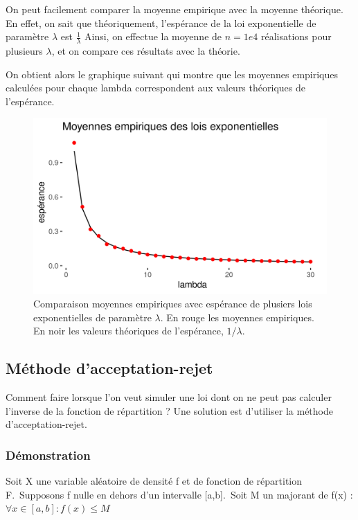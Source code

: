 \documentclass[10pt]{article} %
\begin{document}
On peut facilement comparer la moyenne empirique avec la moyenne théorique. En effet, on sait que théoriquement, l'espérance de la loi
exponentielle de paramètre $\lambda$ est $\frac{1}{\lambda}$ Ainsi, on effectue la moyenne de $n = 1e4$ réalisations pour plusieurs
$\lambda$, et on compare ces résultats avec la théorie.

On obtient alors le graphique suivant qui montre que les moyennes empiriques calculées pour chaque lambda correspondent aux valeurs théoriques
de l'espérance.

\newpage

\begin{figure}[h!]
    \centering
    \includegraphics{media/moyenne_empiriques_exp.png}
    \caption{Comparaison moyennes empiriques avec espérance de plusiers lois exponentielles de paramètre $\lambda$.
    En rouge les moyennes empiriques. En noir les valeurs théoriques de l'espérance, $1/\lambda$.}
\end{figure}


\subsection{Méthode d'acceptation-rejet}

Comment faire lorsque l'on veut simuler une loi dont on ne peut pas calculer l'inverse de la fonction de répartition ? Une solution est d'utiliser la méthode d'acceptation-rejet.

\subsubsection{Démonstration}
Soit X une variable aléatoire de densité f et de fonction de répartition F.\
Supposons f nulle en dehors d'un intervalle [a,b].\
Soit M un majorant de f(x) : $\forall x \in [a,b] : f(x) \leq M$ \
\end{document}
